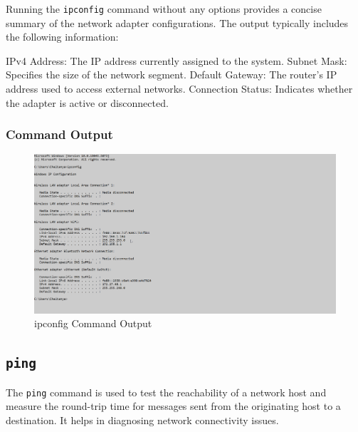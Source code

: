 \documentclass{article}
\begin{document}
Running the \texttt{ipconfig} command without any options provides a concise summary of the network adapter configurations. The output typically includes the following information:

IPv4 Address: The IP address currently assigned to the system.
Subnet Mask: Specifies the size of the network segment.
Default Gateway: The router's IP address used to access external networks.
Connection Status: Indicates whether the adapter is active or disconnected.
\subsubsection{Command Output}

\begin{figure}[htbp]
    \centering
    \includegraphics[]{IPconfig.png}
    \caption{ipconfig Command Output}
    \label{fig:ipconfig_output}
\end{figure}


\clearpage %
\subsection{\texttt{ping}}
The \texttt{ping} command is used to test the reachability of a network host and measure the round-trip time for messages sent from the originating host to a destination. It helps in diagnosing network connectivity issues.
\end{document}
